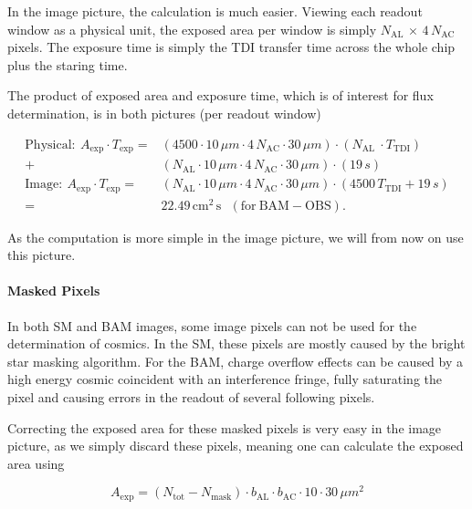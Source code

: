 \documentclass[a4paper, 11pt]{article}
\begin{document}
In the image picture, the calculation is much easier. Viewing each readout window as a physical unit, the exposed area per window is simply $N_\mathrm{AL}$ $\times$ $4\, N_\mathrm{AC}$ pixels. The exposure time is simply the TDI transfer time across the whole chip plus the staring time.

The product of exposed area and exposure time, which is of interest for flux determination, is in both pictures (per readout window)

\begin{align}
  \mathrm{Physical: }~ A_\mathrm{exp} \cdot T_\mathrm{exp} = &\left(4500 \cdot 10\,\mu m \cdot 4\, N_\mathrm{AC} \cdot 30\,\mu m \right) \cdot \left( N_\mathrm{AL}\ \cdot T_\mathrm{TDI} \right) \\+ &\left( N_\mathrm{AL} \cdot 10\,\mu m \cdot 4\, N_\mathrm{AC} \cdot 30\,\mu m\right) \cdot \left( 19\,s \right)\\
  \mathrm{Image: }~ A_\mathrm{exp} \cdot T_\mathrm{exp} = &\left( N_\mathrm{AL} \cdot 10\,\mu m \cdot 4\, N_\mathrm{AC} \cdot 30\,\mu m\right) \cdot \left(4500\, T_\mathrm{TDI} + 19\,s \right)\\
  = &22.49\,\mathrm{cm^{2}\,s} ~~~\mathrm{(for~BAM\!\!-\!\!OBS)}.
\end{align}

As the computation is more simple in the image picture, we will from now on use this picture.

\paragraph{Masked Pixels\\}

In both SM and BAM images, some image pixels can not be used for the determination of cosmics. In the SM, these pixels are mostly caused by the bright star masking algorithm. For the BAM, charge overflow effects can be caused by a high energy cosmic coincident with an interference fringe, fully saturating the pixel and causing errors in the readout of several following pixels.

Correcting the exposed area for these masked pixels is very easy in the image picture, as we simply discard these pixels, meaning one can calculate the exposed area using

\begin{equation}
  A_\mathrm{exp} = (N_\mathrm{tot} - N_\mathrm{mask}) \cdot b_\mathrm{AL} \cdot b_\mathrm{AC} \cdot 10 \cdot 30 \, \mu m^{2}
\end{equation}
\end{document}
